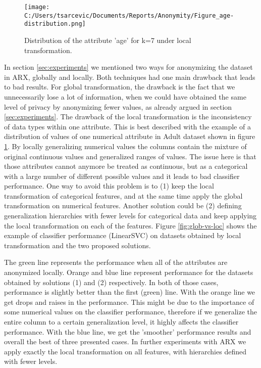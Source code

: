 \documentclass{article}
\begin{document}
\begin{figure}
	\texttt{[image: C:/Users/tsarcevic/Documents/Reports/Anonymity/Figure\_age-distribution.png]}
	\caption{Distribution of the attribute 'age' for k=7 under local transformation.}
 	\label{fig:age-dist}
\end{figure}

In section \ref{sec:experiments} we mentioned two ways for anonymizing the dataset in ARX, globally and locally. Both techniques had one main drawback that leads to bad results. For global transformation, the drawback is the fact that we unnecessarily lose a lot of information, when we could have obtained the same level of privacy by anonymizing fewer values, as already argued in section \ref{sec:experiments}. The drawback of the local transformation is the inconsistency of data types within one attribute. This is best described with the example of a distribution of values of one numerical attribute in Adult dataset shown in figure \ref{fig:age-dist}. By locally generalizing numerical values the columns contain the mixture of original continuous values and generalized ranges of values. The issue here is that those attributes cannot anymore be treated as continuous, but as a categorical with a large number of different possible values and it leads to bad classifier performance. One way to avoid this problem is to (1) keep the local transformation of categorical features, and at the same time apply the global transformation on numerical features. Another solution could be (2) defining generalization hierarchies with fewer levels for categorical data and keep applying the local transformation on each of the features. Figure \ref{fig:glob-vs-loc} shows the example of classifier performance (LinearSVC) on datasets obtained by local transformation and the two proposed solutions. 


The green line represents the performance when all of the attributes are anonymized locally. Orange and blue line represent performance for the datasets obtained by solutions (1) and (2) respectively. In both of those cases, performance is slightly better than the first (green) line. With the orange line we get drops and raises in the performance. This might be due to the importance of some numerical values on the classifier performance, therefore if we generalize the entire column to a certain generalization level, it highly affects the classifier performance. With the blue line, we get the 'smoother' performance results and overall the best of three presented cases. In further experiments with ARX we apply exactly the local transformation on all features, with hierarchies defined with fewer levels. 
\end{document}
